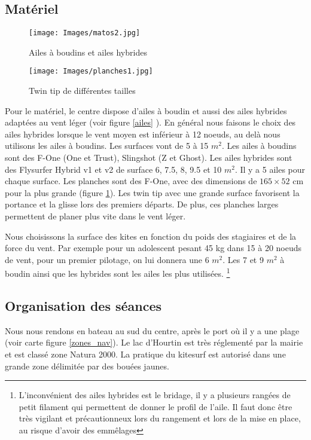 \documentclass[11pt,a4paper]{report}
\begin{document}
\FloatBarrier
\subsection{Matériel}
\begin{figure}[h]
\begin{minipage}{0.4\textwidth}
\texttt{[image: Images/matos2.jpg]} 
\caption{Ailes à boudins et ailes hybrides\label{ailes}}
\end{minipage}
\hfill
\begin{minipage}{0.4\textwidth}
\texttt{[image: Images/planches1.jpg]} 
\caption{Twin tip de différentes tailles\label{planches}}
\end{minipage}
\end{figure}
Pour le matériel, le centre dispose d'ailes à boudin et aussi 
des ailes hybrides adaptées au vent léger (voir figure \ref{ailes} ).
En général nous faisons
le choix des ailes hybrides lorsque le vent moyen est inférieur à
12 noeuds, au delà nous utilisons les ailes à boudins. Les
surfaces vont de 5 à 15 $m^2$. 
Les ailes à boudins sont des F-One (One et Trust), Slingshot (Z et Ghost).
Les ailes hybrides sont des Flysurfer Hybrid v1 et v2 de surface 6, 7.5, 8,
9.5 et 10 $m^2$. Il y a 5 ailes pour chaque surface.
Les planches sont des F-One, avec des dimensions de $165\times52$ cm
pour la plus grande (figure \ref{planches}).
Les twin tip avec une grande surface favorisent la portance et la glisse
lors des premiers départs. De plus, ces planches larges permettent
de planer plus vite dans le vent léger.

Nous choisissons la surface des kites
en fonction du poids des stagiaires et de la force du vent.
Par exemple pour un adolescent pesant 45 kg dans 15 à 20 noeuds
de vent, pour un premier pilotage, on lui donnera une 6 $m^2$.
Les 7 et 9 $m^2$ à boudin ainsi que  les hybrides sont les ailes
les plus utilisées.
\footnote{L'inconvénient des ailes hybrides est le bridage,
il y a plusieurs rangées de petit filament qui permettent
de donner le profil de l'aile. Il faut donc \^etre très 
vigilant et précautionneux lors du rangement et lors de 
la mise en place, au risque d'avoir des emm\^elages}

\subsection{Organisation des séances}

Nous nous rendons en bateau au sud du centre, après le port o\`u
il y a une plage (voir carte figure \ref{zones_nav}). Le lac 
d'Hourtin est très réglementé par la mairie et est classé
zone Natura 2000\cite{natura2000}. La pratique du kitesurf 
est autorisé dans une  grande zone délimitée par des bouées jaunes. 
\end{document}
